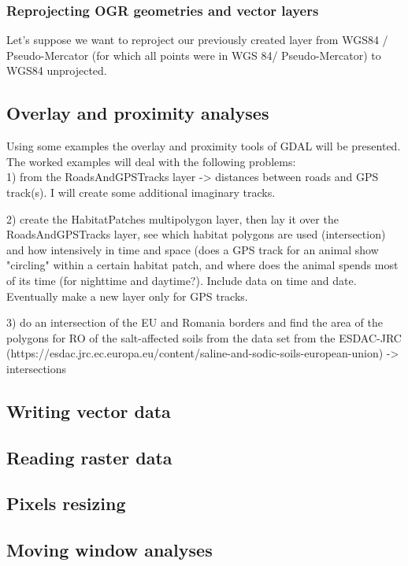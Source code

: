 \documentclass {article}
\begin{document}
\subsubsection {Reprojecting OGR geometries and vector layers} 

Let's suppose we want to reproject our previously created layer from WGS84 / Pseudo-Mercator (for which all points were in WGS 84/ Pseudo-Mercator) to WGS84 unprojected.  

\subsection {Overlay and proximity analyses}

Using some examples the overlay and proximity tools of GDAL will be presented. The worked examples will deal with the following problems: \\

1) from the RoadsAndGPSTracks layer -> distances between roads and GPS track(s). I will create some additional imaginary tracks. 

2) create the HabitatPatches multipolygon layer, then lay it over the RoadsAndGPSTracks layer, see which habitat polygons are used (intersection) and how intensively in time and space (does a GPS track for an animal show "circling" within a certain habitat patch, and where does the animal spends most of its time (for nighttime and daytime?). Include data on time and date. Eventually make a new layer only for GPS tracks.

3) do an intersection of the EU and Romania borders and find the area of the polygons for RO of the salt-affected soils from the data set from the ESDAC-JRC (https://esdac.jrc.ec.europa.eu/content/saline-and-sodic-soils-european-union) -> intersections 
 

\subsection {Writing vector data}

\subsection {Reading raster data}

\subsection {Pixels resizing}

\subsection {Moving window analyses}
\end{document}
